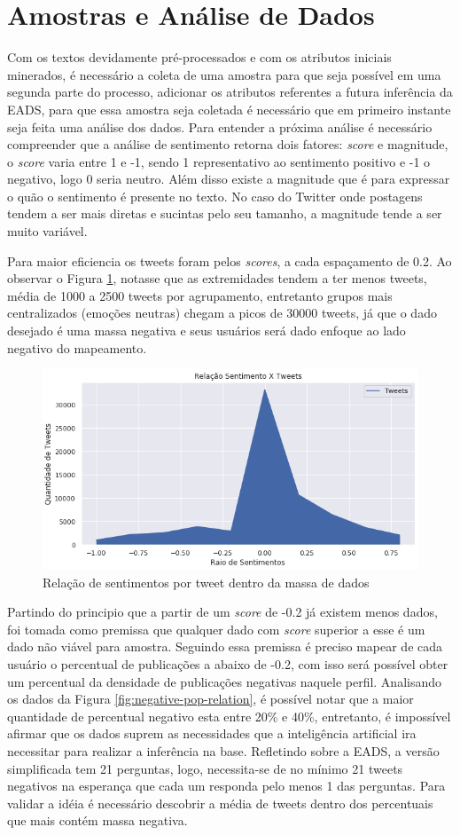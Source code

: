 \section{Amostras e Análise de Dados}
Com os textos devidamente pré-processados e com os atributos iniciais minerados, é necessário a coleta de uma amostra para que seja possível em uma segunda parte do processo, adicionar os atributos referentes a futura inferência da EADS, para que essa amostra seja coletada é necessário que em primeiro instante seja feita uma análise dos dados. Para entender a próxima análise é necessário compreender que a análise de sentimento retorna dois fatores: \textit{score} e magnitude, o \textit{score} varia entre 1 e -1, sendo 1 representativo ao sentimento positivo e -1 o negativo, logo 0 seria neutro. Além disso existe a magnitude que é para expressar o quão o sentimento é presente no texto. No caso do Twitter onde postagens tendem a ser mais diretas e sucintas pelo seu tamanho, a magnitude tende a ser muito variável.

Para maior eficiencia os tweets foram pelos \textit{scores}, a cada espaçamento de 0.2. Ao observar o Figura \ref{fig:sentiment-relation}, notasse que as extremidades tendem a ter menos tweets, média de 1000 a 2500 tweets por agrupamento, entretanto grupos mais centralizados (emoções neutras) chegam a picos de 30000 tweets, já que o dado desejado é uma massa negativa e seus usuários será dado enfoque ao lado negativo do mapeamento.

\begin{figure}[!ht]
    \centering
    \includegraphics[width=.6\textwidth]{imagens/relacao-sentimento.png}
    \caption{Relação de sentimentos por tweet dentro da massa de dados}
    \label{fig:sentiment-relation}
\end{figure}


Partindo do principio que a partir de um \textit{score} de -0.2 já existem menos dados, foi tomada como premissa que qualquer dado com \textit{score} superior a esse é um dado não viável para amostra. Seguindo essa premissa é preciso mapear de cada usuário o percentual de publicações a abaixo de -0.2, com isso será possível obter um percentual da densidade de publicações negativas naquele perfil. Analisando os dados da Figura \ref{fig:negative-pop-relation}, é possível notar que a maior quantidade de percentual negativo esta entre 20\% e 40\%, entretanto, é impossível afirmar que os dados suprem as necessidades que a inteligência artificial ira necessitar para realizar a inferência na base. Refletindo sobre a EADS, a versão simplificada tem 21 perguntas, logo, necessita-se de no mínimo 21 tweets negativos na esperança que cada um responda pelo menos 1 das perguntas. Para validar a idéia é necessário descobrir a média de tweets dentro dos percentuais que mais contém massa negativa.

